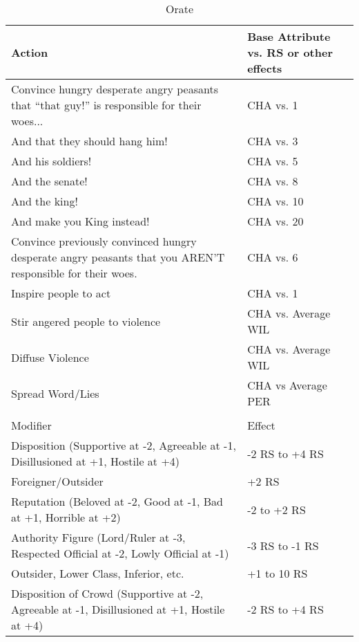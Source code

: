 \documentclass[oneside,11pt,english]{book}
\begin{document}
\begin{longtabu} to \linewidth{X[1.5]X[r]}
	\caption{Orate}
	\label{tab:Orate}\\
	\rowfont[c]{}Action &Base Attribute vs. RS or other effects\\\toprule
Convince hungry desperate angry peasants that “that guy!” is responsible for their woes... &CHA vs. 1\\
And that they should hang him! &CHA vs. 3\\
And his soldiers! &CHA vs. 5 \\
And the senate! &CHA vs. 8 \\
And the king! &CHA vs. 10 \\
And make you King instead! &CHA vs. 20 \\
Convince previously convinced hungry desperate angry peasants that you AREN’T responsible for their woes.&CHA vs. 6 \\
Inspire people to act &CHA vs. 1 \\
Stir angered people to violence &CHA vs. Average WIL \\
Diffuse Violence &CHA vs. Average WIL \\
Spread Word/Lies &CHA vs Average PER \\
	\\
		\rowfont[c]{} Modifier & Effect\\\cmidrule(lr){1-2} 
Disposition (Supportive at -2, Agreeable at -1, Disillusioned at +1, Hostile at +4)&-2 RS to +4 RS\\
Foreigner/Outsider&+2 RS \\
Reputation (Beloved at -2, Good at -1, Bad at +1, Horrible at +2) &-2 to +2 RS \\
Authority Figure (Lord/Ruler at -3, Respected Official at -2, Lowly Official at -1) &-3 RS to -1 RS\\
Outsider, Lower Class, Inferior, etc. &+1 to 10 RS\\
Disposition of Crowd (Supportive at -2, Agreeable at -1, Disillusioned at +1, Hostile at +4) &-2 RS to +4 RS \\
\end{longtabu}
\end{document}

